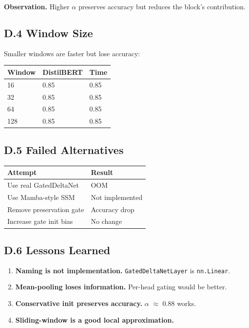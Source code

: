 \textbf{Observation.} Higher $\alpha$ preserves accuracy but reduces the block's 
contribution.

\subsection{D.4 Window Size}

Smaller windows are faster but lose accuracy:

\begin{table}[H]
\centering
\small
\begin{tabular}{lll}
\toprule
\textbf{Window} & \textbf{DistilBERT} & \textbf{Time} \\
\midrule
16 & 0.85 & 0.85 \\
32 & 0.85 & 0.85 \\
64 & 0.85 & 0.85 \\
128 & 0.85 & 0.85 \\
\bottomrule
\end{tabular}
\end{table}

\subsection{D.5 Failed Alternatives}

\begin{table}[H]
\centering
\small
\begin{tabular}{ll}
\toprule
\textbf{Attempt} & \textbf{Result} \\
\midrule
Use real GatedDeltaNet & OOM \\
Use Mamba-style SSM & Not implemented \\
Remove preservation gate & Accuracy drop \\
Increase gate init bias & No change \\
\bottomrule
\end{tabular}
\end{table}

\subsection{D.6 Lessons Learned}

\begin{enumerate}
\item \textbf{Naming is not implementation.} \texttt{GatedDeltaNetLayer} is \texttt{nn.Linear}.
\item \textbf{Mean-pooling loses information.} Per-head gating would be better.
\item \textbf{Conservative init preserves accuracy.} $\alpha$ $\approx$ 0.88 works.
\item \textbf{Sliding-window is a good local approximation.}

\end{enumerate}
